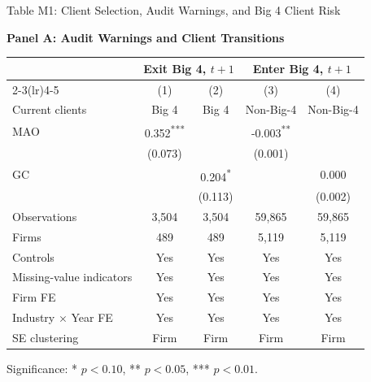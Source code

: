 \documentclass[10pt]{article}
\newcommand{\sym}[1]{\textsuperscript{#1}}
\begin{document}
\begin{minipage}{19cm}\fontsize{10}{12}\selectfont\setlength{\tabcolsep}{4pt}\renewcommand{\arraystretch}{1.15}

\setlength{\tabcolsep}{4pt}
\begin{center} Table M1: Client Selection, Audit Warnings, and Big 4 Client Risk\end{center}
\noindent\textbf{Panel A: Audit Warnings and Client Transitions}\par\medskip
\begin{center}\begin{tabular*}{\textwidth}{@{\extracolsep{\fill}}lcccc@{}}
\toprule
 & \multicolumn{2}{c}{Exit Big 4, $t+1$} & \multicolumn{2}{c}{Enter Big 4, $t+1$} \\
\cmidrule(lr){2-3}\cmidrule(lr){4-5}
 & (1) & (2) & (3) & (4) \\
Current clients & Big 4 & Big 4 & Non-Big-4 & Non-Big-4 \\
\midrule
MAO & 0.352\sym{***} &  & -0.003\sym{**} &  \\
 & (0.073) &  & (0.001) &  \\
GC &  & 0.204\sym{*} &  & 0.000 \\
 &  & (0.113) &  & (0.002) \\
\midrule
Observations & 3,504 & 3,504 & 59,865 & 59,865 \\
Firms & 489 & 489 & 5,119 & 5,119 \\
Controls & Yes & Yes & Yes & Yes \\
Missing-value indicators & Yes & Yes & Yes & Yes \\
Firm FE & Yes & Yes & Yes & Yes \\
Industry $\times$ Year FE & Yes & Yes & Yes & Yes \\
SE clustering & Firm & Firm & Firm & Firm \\
\bottomrule\end{tabular*}\end{center}

\par\smallskip\raggedright\fontsize{9}{11}\selectfont Significance: * $p<0.10$, ** $p<0.05$, *** $p<0.01$.
\end{minipage}
\end{document}
